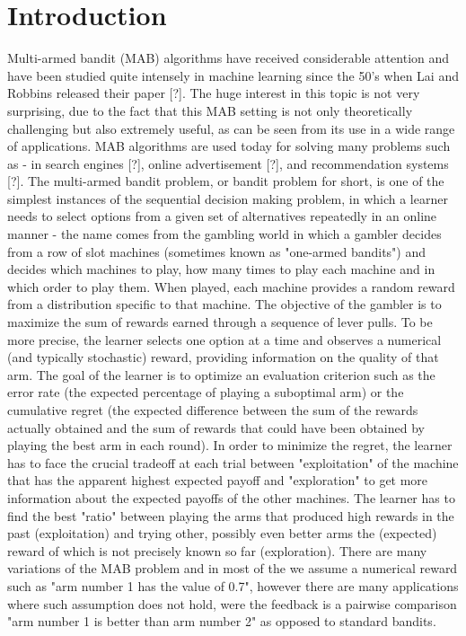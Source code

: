 \documentclass{llncs}
\begin{document}
\section{Introduction}
	Multi-armed bandit (MAB) algorithms have received considerable attention and have been studied quite intensely in machine learning since the 50's when  Lai and Robbins released their paper [?]. 
	The huge interest in this topic is not very surprising, due to the fact that this MAB setting is not only theoretically challenging but also extremely useful, as can be seen from its use in a wide range of applications. MAB algorithms are used today for solving many problems such as - in search engines [?], online advertisement [?], and recommendation systems [?].
	The multi-armed bandit problem, or bandit problem for short, is one of the simplest instances of the sequential decision making problem, in which a learner needs to select options from a given set of alternatives repeatedly in an online manner -  the name comes from the gambling world in which a gambler decides from a row of slot machines (sometimes known as "one-armed bandits") and decides which machines to play, how many times to play each machine and in which order to play them. When played, each machine provides a random reward from a distribution specific to that machine. 
	The objective of the gambler is to maximize the sum of rewards earned through a sequence of lever pulls. 
	To be more precise, the learner selects one option at a time and observes a numerical (and typically stochastic) reward, providing information on the quality of that arm. The goal of the learner is to optimize an evaluation criterion such as the error rate (the expected percentage of playing a suboptimal arm) or the cumulative regret (the expected difference between the sum of the rewards actually obtained and the sum of rewards that could have been obtained by playing the best arm in each round).
	In order to minimize the regret, the learner has to face the crucial tradeoff at each trial between "exploitation" of the machine that has the apparent highest expected payoff and "exploration" to get more information about the expected payoffs of the other machines. 
	The learner has to find the best "ratio" between playing the arms that produced high rewards in the past (exploitation) and trying other, possibly even better arms the (expected) reward of which is not precisely known so far (exploration).
	There are many variations of the MAB problem and in most of the we assume a numerical reward such as "arm  number 1 has the value of 0.7", however there are many applications where such assumption does not hold,  were the feedback is a pairwise comparison "arm number 1 is better than arm number 2" as opposed to standard bandits.
\end{document}
